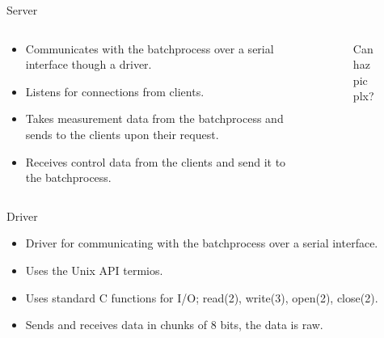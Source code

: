 \documentclass{beamer}
\begin{document}
\begin{frame}{Server}
\begin{columns}[T]
    \begin{column}{.55\textwidth}
        \begin{itemize}
            \item Communicates with the batchprocess over a serial interface though a driver.
            \item Listens for connections from clients.
            \item Takes measurement data from the batchprocess and sends to the clients upon their request.
            	\item Receives control data from the clients and send it to the batchprocess.
        \end{itemize}
    \end{column}
    \begin{column}{.45\textwidth}

        \begin{figure}[H]
           \centering
           	Can haz pic plx?
        \end{figure}

    \end{column}
\end{columns}
\end{frame}

\begin{frame}{Driver}
        \begin{itemize}
            \item Driver for communicating with the batchprocess over a serial interface.
            \item Uses the Unix API termios.
            \item Uses standard C functions for I/O; read(2), write(3), open(2), close(2).
            \item Sends and receives data in chunks of 8 bits, the data is raw.   
        \end{itemize}
\end{frame}
\end{document}
